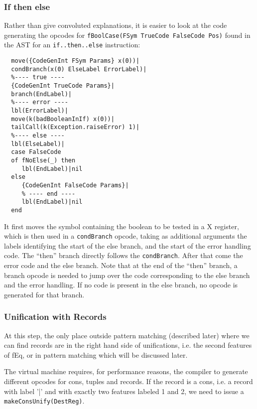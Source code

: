 \documentclass[a4paper]{memoir}
\begin{document}
\subsubsection{If then else}
Rather than give convoluted explanations, it is easier to look at the code generating the opcodes for \lstinline!fBoolCase(FSym TrueCode FalseCode Pos)! found in the AST for an \lstinline!if..then..else! instruction:
\begin{lstlisting}
  move({CodeGenInt FSym Params} x(0))|
  condBranch(x(0) ElseLabel ErrorLabel)|
  %---- true ----
  {CodeGenInt TrueCode Params}|
  branch(EndLabel)|
  %---- error ----
  lbl(ErrorLabel)|
  move(k(badBooleanInIf) x(0))|
  tailCall(k(Exception.raiseError) 1)|
  %---- else ----
  lbl(ElseLabel)|
  case FalseCode
  of fNoElse(_) then
     lbl(EndLabel)|nil
  else
     {CodeGenInt FalseCode Params}|
     % ---- end ----
     lbl(EndLabel)|nil
  end
\end{lstlisting}
It first moves the symbol containing the boolean to be tested in a X register, which is then used in a \lstinline!condBranch! opcode, taking as additional arguments the labels identifying the start of the else branch, and the start of the error handling code. The ``then'' branch directly follows the \lstinline!condBranch!. After that come the error code and the else branch. Note that at the end of the ``then'' branch, a branch opcode is needed to jump over the code corresponding to the else branch and the error handling. 
If no code is present in the else branch, no opcode is generated for that branch.

\subsubsection{Unification with Records}
At this step, the only place outside pattern matching (described later) where we can find records are in the right hand side of unifications, i.e. the second features of fEq, or in pattern matching which will be discussed later. 

The virtual machine requires, for performance reasons, the compiler to generate different opcodes for cons, tuples and records.
If the record is a cons, i.e. a record with label '|' and with exactly two features labeled 1 and 2, we need to issue a \lstinline!makeConsUnify(DestReg)!. 
\end{document}
